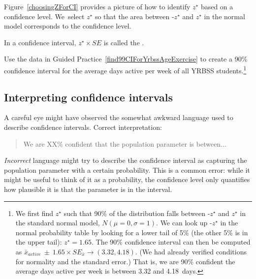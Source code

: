 Figure~\ref{choosingZForCI} provides a picture of how to identify $z^{\star}$ based on a confidence level. We~select $z^{\star}$ so that the area between -$z^{\star}$ and $z^{\star}$ in the normal model corresponds to the confidence level. 

\begin{termBox}{
\label{marginOfErrorTermBox}In a confidence interval, $z^{\star}\times SE$ is called the .}
\end{termBox}

\textC{\newpage}

\begin{exercise} \label{find90CIForYrbssAgeExercise}
Use the data in Guided Practice~\ref{find99CIForYrbssAgeExercise} to create a 90\% confidence interval for the average days active per week of all YRBSS students.\footnote{We first find $z^{\star}$ such that 90\% of the distribution falls between -$z^{\star}$ and $z^{\star}$ in the standard normal model, $N(\mu=0, \sigma=1)$. We can look up -$z^{\star}$ in the normal probability table by looking for a lower tail of 5\% (the other 5\% is in the upper tail): $z^{\star}=1.65$. The 90\% confidence interval can then be computed as $\bar{x}_{active}\ \pm\ 1.65\times SE_{\bar{x}} \to (3.32, 4.18)$. (We had already verified conditions for normality and the standard error.) That is, we are 90\% confident the average days active per week is between 3.32 and 4.18~days.}
\end{exercise}

\subsection{Interpreting confidence intervals}
\label{interpretingCIs}


A careful eye might have observed the somewhat awkward language used to describe confidence intervals. Correct interpretation:
\begin{quote}
We are XX\% confident that the population parameter is between...
\end{quote}
\emph{Incorrect} language might try to describe the confidence interval as capturing the population parameter with a certain probability. This is a common error: while it might be useful to think of it as a probability, the confidence level only quantifies how plausible it is that the parameter is in the interval.


